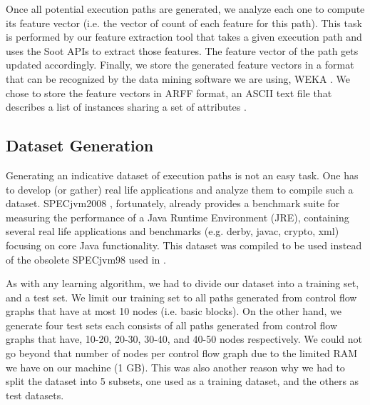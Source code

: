 \documentclass[10pt,twocolumn,letterpaper]{article}
\begin{document}
Once all potential execution paths are generated, we analyze each one to compute its feature vector (i.e. the vector of count of each feature for this path).
This task is performed by our feature extraction tool that takes a given execution path and uses the Soot \cite{vallee1999soot} APIs to extract those features.
The feature vector of the path gets updated accordingly. Finally, we store the generated feature vectors in a format that can be recognized by the data mining
software we are using, WEKA \cite{hall2009weka}. We chose to store the feature vectors in ARFF format, an ASCII text file that describes a list of instances
sharing a set of attributes \cite{arff}.

\subsection{Dataset Generation}
\label{dataset-generation}
Generating an indicative dataset of execution paths is not an easy task. One has to develop (or gather) real life applications and analyze them to compile such
a dataset. SPECjvm2008 \cite{specjvm2008}, fortunately, already provides a benchmark suite for measuring the performance of a Java Runtime Environment (JRE),
containing several real life applications and benchmarks (e.g. derby, javac, crypto, xml) focusing on core Java functionality. This dataset was compiled
to be used instead of the obsolete SPECjvm98 \cite{specjvm98} used in \cite{buse2009road}.

As with any learning algorithm, we had to divide our dataset into a training set, and a test set. We limit our training set to all paths generated from control
flow graphs that have at most 10 nodes (i.e. basic blocks). On the other hand, we generate four test sets each consists of all paths generated from
control flow graphs that have, 10-20, 20-30, 30-40, and 40-50 nodes respectively. We could not go beyond that number of nodes per control flow graph due to the
limited RAM we have on our machine (1 GB). This was also another reason why we had to split the dataset into 5 subsets, one used as a training dataset, and the
others as test datasets.

\begin{table}[h!]
\centering
{}
\centering
\caption{The characteristics of the datasets with the class attribute missing.}
\label{tab:no-class}
\end{table}
\end{document}
